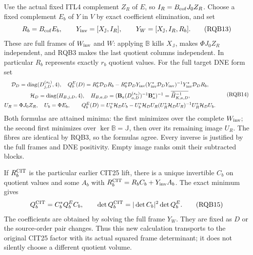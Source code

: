 \documentclass[11pt,a4paper]{article}
\begin{document}
Use the actual fixed ITL4 complement $Z_R$ of $E$, so
$I_R=B_{\rm cof}J_0Z_R$. Choose a fixed complement $E_b$ of $Y$
in $V$ by exact coefficient elimination, and set
\[
 R_b=B_{\rm cof}E_b,\qquad
 Y_{\rm inv}=[X_{\mathbb J},I_R],\qquad
 Y_W=[X_{\mathbb J},I_R,R_b].
 \tag{RQB13}
\]
These are full frames of $W_{\rm inv}$ and $W$: applying
$\mathbb B$ kills $X_{\mathbb J}$, makes $\Phi J_0Z_R$ independent,
and RQB3 makes the last quotient columns independent.
In particular $R_b$ represents exactly $r_b$ quotient values.
For the full target DNE form set
\[
\begin{gathered}
 \mathcal D_D=\operatorname{diag}(D_{j,D}^{(s_1)},4),\quad
 Q_b^E(D)=R_b^*\mathcal D_D R_b
 -R_b^*\mathcal D_DY_{\rm inv}
       (Y_{\rm inv}^*\mathcal D_DY_{\rm inv})^{-1}
                          Y_{\rm inv}^*\mathcal D_D R_b,\\
 \mathcal H_D=\operatorname{diag}(H_{B,j,D},4),\quad
 H_{B,a,D}=(\mathbf B_a(D_{a,D}^{(s_a)})^{-1}\mathbf B_a^*)^{-1}
                   =\overline{\widehat H_{K,a,D}^{-1}},\\
 U_R=\Phi J_0Z_R,\quad U_b=\Phi E_b,\qquad
 Q_b^E(D)=U_b^*\mathcal H_DU_b
 -U_b^*\mathcal H_DU_R(U_R^*\mathcal H_DU_R)^{-1}
                                      U_R^*\mathcal H_DU_b .
\end{gathered}\tag{RQB14}
\]
Both formulas are attained minima: the first minimizes over the
complete $W_{\rm inv}$; the second first minimizes over
$\ker\mathbb B=\mathbb J$, then over its remaining image $U_R$.
The fibres are identical by RQB3, so the formulas agree.
Every inverse is justified by the full frames and DNE positivity.
Empty image ranks omit their subtracted blocks.

If $R_b^{\rm CIT}$ is the particular earlier CIT25 lift, there is
a unique invertible $C_b$ on quotient values and some $A_b$ with
$R_b^{\rm CIT}=R_b C_b+Y_{\rm inv}A_b$.
The exact minimum gives
\[
 Q_b^{\rm CIT}=C_b^*Q_b^E C_b,\qquad
 \det Q_b^{\rm CIT}=|\det C_b|^2\det Q_b^E .
 \tag{RQB15}
\]
The coefficients are obtained by solving the full frame $Y_W$.
They are fixed as $D$ or the source-order pair changes. Thus this
new calculation transports to the original CIT25 factor with its
actual squared frame determinant; it does not silently choose a
different quotient volume.
\end{document}
